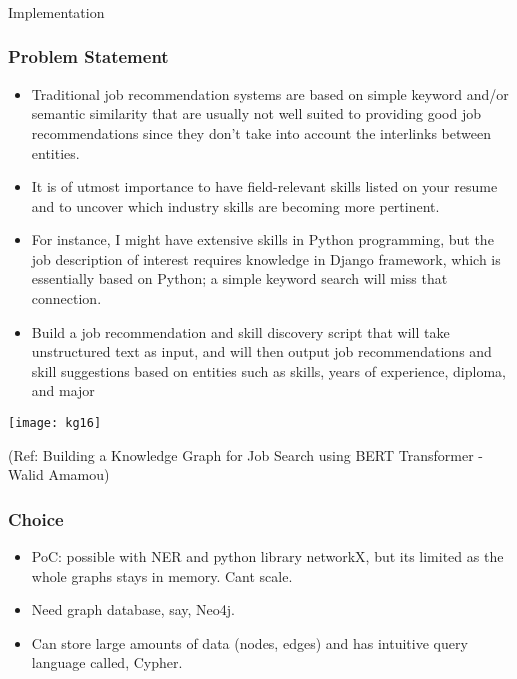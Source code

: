 \begin{frame}[fragile]\frametitle{}
\begin{center}
{\Large Implementation}
\end{center}
\end{frame}



\begin{frame}[fragile]\frametitle{Problem Statement}

\begin{itemize}
\item Traditional job recommendation systems are based on simple keyword and/or semantic similarity that are usually not well suited to providing good job recommendations since they don’t take into account the interlinks between entities. 
\item It is of utmost importance to have field-relevant skills listed on your resume and to uncover which industry skills are becoming more pertinent.
\item For instance, I might have extensive skills in Python programming, but the job description of interest requires knowledge in Django framework, which is essentially based on Python; a simple keyword search will miss that connection.
\item Build a job recommendation and skill discovery script that will take unstructured text as input, and will then output job recommendations and skill suggestions based on entities such as skills, years of experience, diploma, and major
\end{itemize}
	  
			\begin{center}
			\texttt{[image: kg16]}
			\end{center}	
			
			{\tiny (Ref: Building a Knowledge Graph for Job Search using BERT Transformer - Walid Amamou)}		
\end{frame}



\begin{frame}[fragile]\frametitle{Choice}

\begin{itemize}
\item PoC: possible with NER and python library networkX, but its limited as the whole graphs stays in memory. Cant scale.
\item Need graph database, say, Neo4j.
\item Can store large amounts of data (nodes, edges) and has intuitive query language called, Cypher.
\end{itemize}
	  
\end{frame}

